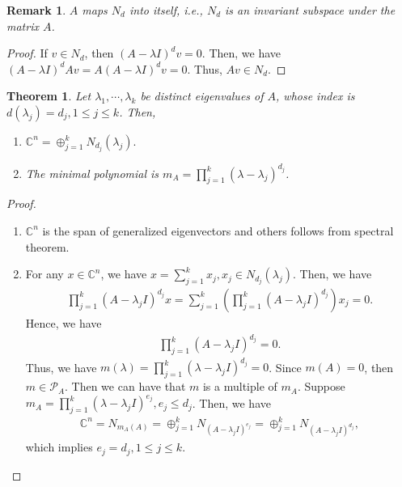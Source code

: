 \documentclass[10pt]{book}
\newtheorem{theorem}{Theorem}[chapter]
\newtheorem{remark}{Remark}[chapter]
\theoremstyle{definition}
\numberwithin{equation}{chapter}
\begin{document}
\medskip

\begin{remark}
$A$ maps $N_d$ into itself, i.e., $N_d$ is an invariant subspace under the matrix $A$.
\end{remark}
\begin{proof}
If $v\in N_d$, then $(A - \lambda I)^d v = 0$. Then, we have $(A - \lambda I)^d Av = A(A - \lambda I)^d v = 0$. Thus, $Av \in N_d$.
\end{proof}

\medskip

\begin{theorem}
Let $\lambda_1,\cdots,\lambda_k$ be distinct eigenvalues of $A$, whose index is $d\left(\lambda_j\right) = d_j, 1\leq j \leq k$. Then,
\begin{enumerate}[label=(\alph*)]
    \item $\mathbb{C}^n = \oplus^k_{j=1}N_{d_j}(\lambda_j).$
    \item The minimal polynomial is $m_A = \prod^k_{j=1}\left(\lambda - \lambda_j \right)^{d_j}$.
\end{enumerate}
\end{theorem}
\begin{proof}
~\begin{enumerate}[label=(\alph*)]
    \item $\mathbb{C}^n$ is the span of generalized eigenvectors and others follows from spectral theorem.
    \item For any $x\in\mathbb{C}^n$, we have $x = \sum^k_{j=1}x_j, x_j\in N_{d_j}(\lambda_j)$. Then, we have 
    \begin{align*}
        \prod^k_{j=1} \left(A - \lambda_j I\right)^{d_j}x = \sum^k_{j=1}\left(\prod^k_{j=1} \left(A - \lambda_j I\right)^{d_j} \right)x_j = 0.
    \end{align*}
    Hence, we have 
    \begin{align*}
        \prod^k_{j=1} \left(A - \lambda_j I\right)^{d_j} = 0.
    \end{align*}
    Thus, we have $m(\lambda) = \prod^k_{j=1} \left(\lambda - \lambda_j I\right)^{d_j} = 0$. Since $m(A) = 0$, then $m\in \mathcal{P}_A$. Then we can have that $m$ is a multiple of $m_A$. Suppose $m_A = \prod^k_{j=1} \left(\lambda - \lambda_j I\right)^{e_j}, e_j\leq d_j$. Then, we have 
    \begin{align*}
        \mathbb{C}^n = N_{m_A(A)} = \oplus^k_{j=1}N_{(A-\lambda_j I)^{e_j}} = \oplus^k_{j=1}N_{(A-\lambda_j I)^{d_j}},
    \end{align*}
    which implies $e_j = d_j, 1\leq j \leq k$.
\end{enumerate}
\end{proof}
\end{document}
